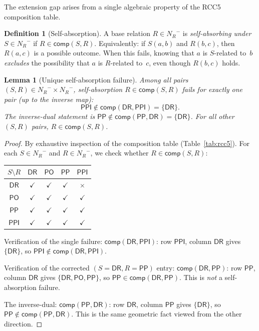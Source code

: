 \documentclass[a4paper,11pt]{article}
\newtheorem{lemma}[theorem]{Lemma}
\theoremstyle{definition}
\newtheorem{definition}[theorem]{Definition}
\newcommand{\NR}{\ensuremath{N_R}}
\newcommand{\DR}{\ensuremath{\mathsf{DR}}}
\newcommand{\PO}{\ensuremath{\mathsf{PO}}}
\newcommand{\PP}{\ensuremath{\mathsf{PP}}}
\newcommand{\PPI}{\ensuremath{\mathsf{PPI}}}
\newcommand{\comp}{\ensuremath{\mathsf{comp}}}
\begin{document}
The extension gap arises from a single algebraic property of the RCC5
composition table.

\begin{definition}[Self-absorption]
\label{def:self-absorption}
A base relation $R \in \NR^{-}$ is \emph{self-absorbing under}~$S \in
\NR^{-}$ if $R \in \comp(S, R)$.  Equivalently: if $S(a,b)$ and
$R(b,c)$, then $R(a,c)$ is a possible outcome.  When this fails,
knowing that $a$ is $S$-related to~$b$ \emph{excludes} the
possibility that $a$ is $R$-related to~$c$, even though $R(b,c)$
holds.
\end{definition}

\begin{lemma}[Unique self-absorption failure]
\label{lem:unique-failure}
Among all pairs $(S, R) \in \NR^{-} \times \NR^{-}$, self-absorption
$R \in \comp(S, R)$ fails for exactly one pair \textup{(}up to the
inverse map\textup{)}:
\[
  \PPI \notin \comp(\DR, \PPI) = \{\DR\}.
\]
The inverse-dual statement is $\PP \notin \comp(\PP, \DR) = \{\DR\}$.
For all other $(S, R)$ pairs, $R \in \comp(S,R)$.
\end{lemma}

\begin{proof}
By exhaustive inspection of the composition table
(Table~\ref{tab:rcc5}).  For each $S \in \NR^{-}$ and $R \in
\NR^{-}$, we check whether $R \in \comp(S, R)$:

\smallskip
\begin{center}
\renewcommand{\arraystretch}{1.1}
\begin{tabular}{c|cccc}
\toprule
$S \setminus R$ & $\DR$ & $\PO$ & $\PP$ & $\PPI$ \\
\midrule
$\DR$  & $\checkmark$ & $\checkmark$ & $\checkmark$ & $\times$ \\
$\PO$  & $\checkmark$ & $\checkmark$ & $\checkmark$ & $\checkmark$ \\
$\PP$  & $\checkmark$ & $\checkmark$ & $\checkmark$ & $\checkmark$ \\
$\PPI$ & $\checkmark$ & $\checkmark$ & $\checkmark$ & $\checkmark$ \\
\bottomrule
\end{tabular}
\end{center}

\smallskip\noindent
Verification of the single failure:
$\comp(\DR, \PPI)$: row $\PPI$, column $\DR$ gives $\{\DR\}$, so
$\PPI \notin \comp(\DR, \PPI)$.

Verification of the corrected $(S{=}\DR, R{=}\PP)$ entry:
$\comp(\DR, \PP)$: row $\PP$, column $\DR$ gives $\{\DR, \PO, \PP\}$,
so $\PP \in \comp(\DR, \PP)$.  This is \emph{not} a self-absorption failure.

The inverse-dual: $\comp(\PP, \DR)$: row $\DR$, column $\PP$ gives
$\{\DR\}$, so $\PP \notin \comp(\PP, \DR)$.  This is the same
geometric fact viewed from the other direction.
\end{proof}
\end{document}
